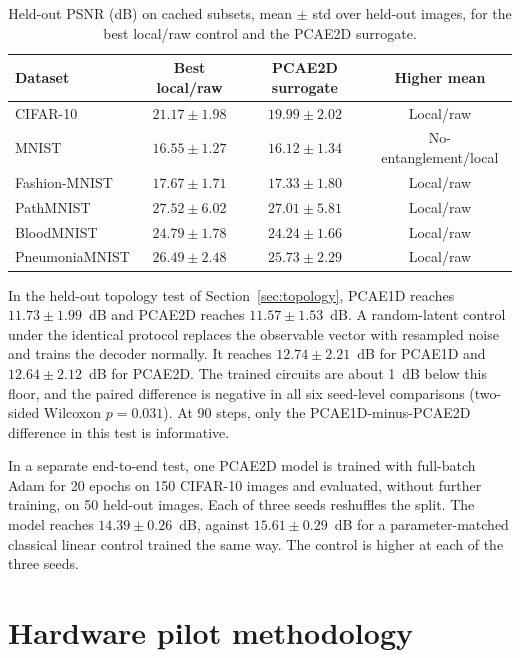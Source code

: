 \documentclass[pdflatex,sn-basic]{sn-jnl}
\begin{document}
\begin{appendices}
\begin{table}[!htbp]
\centering
\caption{Held-out PSNR (dB) on cached subsets, mean $\pm$ std over held-out images, for the best local/raw control and the PCAE2D surrogate.}
\label{tab:multi_dataset_reconstruction}
\footnotesize
\begin{tabular}{lccc}
\toprule
Dataset & Best local/raw & PCAE2D surrogate & Higher mean \\
\midrule
CIFAR-10 & $21.17{\pm}1.98$ & $19.99{\pm}2.02$ & Local/raw \\
MNIST & $16.55{\pm}1.27$ & $16.12{\pm}1.34$ & No-entanglement/local \\
Fashion-MNIST & $17.67{\pm}1.71$ & $17.33{\pm}1.80$ & Local/raw \\
PathMNIST & $27.52{\pm}6.02$ & $27.01{\pm}5.81$ & Local/raw \\
BloodMNIST & $24.79{\pm}1.78$ & $24.24{\pm}1.66$ & Local/raw \\
PneumoniaMNIST & $26.49{\pm}2.48$ & $25.73{\pm}2.29$ & Local/raw \\
\bottomrule
\end{tabular}
\end{table}

\label{app:random_latent}%
In the held-out topology test of Section~\ref{sec:topology}, PCAE1D reaches $11.73\pm1.99$~dB and PCAE2D reaches $11.57\pm1.53$~dB.
A random-latent control under the identical protocol replaces the observable vector with resampled noise and trains the decoder normally.
It reaches $12.74\pm2.21$~dB for PCAE1D and $12.64\pm2.12$~dB for PCAE2D.
The trained circuits are about 1~dB below this floor, and the paired difference is negative in all six seed-level comparisons (two-sided Wilcoxon $p=0.031$).
At 90 steps, only the PCAE1D-minus-PCAE2D difference in this test is informative.

In a separate end-to-end test, one PCAE2D model is trained with full-batch Adam for 20 epochs on 150 CIFAR-10 images and evaluated, without further training, on 50 held-out images.
Each of three seeds reshuffles the split.
The model reaches $14.39\pm0.26$~dB, against $15.61\pm0.29$~dB for a parameter-matched classical linear control trained the same way.
The control is higher at each of the three seeds.

\section{Hardware pilot methodology}
\label{sec:hardware_methodology}


\end{appendices}
\end{document}

